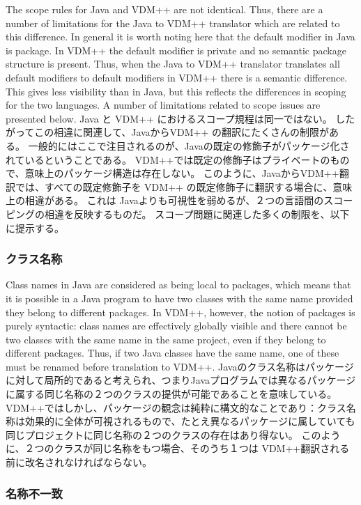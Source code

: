 \documentclass[\pformat,12pt]{jarticle}
\begin{document}
The scope rules for Java and VDM++ are not identical. Thus, there are
a number of limitations for the Java to VDM++ translator which are
related to this difference. In general it is worth noting here that
the default modifier in Java is package. In VDM++ the default modifier
is private and no semantic package structure is present. Thus, when
the Java to VDM++ translator translates all default modifiers to
default modifiers in VDM++ there is a semantic difference. This gives
less visibility than in Java, but this reflects the differences in
scoping for the two languages. A number of limitations related
to scope issues are presented below.
Java と VDM++ におけるスコープ規程は同一ではない。
したがってこの相違に関連して、JavaからVDM++ の翻訳にたくさんの制限がある。
一般的にはここで注目されるのが、Javaの既定の修飾子がパッケージ化されているということである。
VDM++では既定の修飾子はプライベートのもので、意味上のパッケージ構造は存在しない。 
このように、JavaからVDM++翻訳では、すべての既定修飾子を VDM++ の既定修飾子に翻訳する場合に、意味上の相違がある。
これは Javaよりも可視性を弱めるが、２つの言語間のスコーピングの相違を反映するものだ。
スコープ問題に関連した多くの制限を、以下に提示する。

\subsubsection{クラス名称}

Class names in Java are considered as being local to packages, which
means that it is possible in a Java program to have two classes with
the same name provided they belong to different packages. In VDM++,
however,  the notion of packages is purely syntactic: class
names are effectively globally visible and there cannot be two classes
with the same name in the same project, even if they belong to
different packages. Thus, if two Java classes have the same name, one
of these must be renamed before translation to VDM++.
Javaのクラス名称はパッケージに対して局所的であると考えられ、つまりJavaプログラムでは異なるパッケージに属する同じ名称の２つのクラスの提供が可能であることを意味している。
VDM++ではしかし、パッケージの観念は純粋に構文的なことであり：クラス名称は効果的に全体が可視されるもので、たとえ異なるパッケージに属していても同じプロジェクトに同じ名称の２つのクラスの存在はあり得ない。
このように、２つのクラスが同じ名称をもつ場合、そのうち１つは VDM++翻訳される前に改名されなければならない。

\subsubsection{名称不一致}
\end{document}

